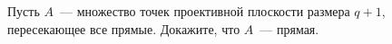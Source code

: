 Пусть $A$~--- множество точек проективной плоскости размера $q + 1$, пересекающее все прямые. Докажите,
что $A$~--- прямая.
